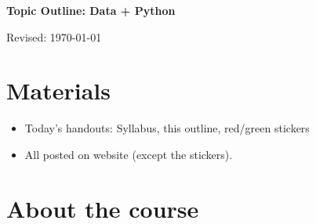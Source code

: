 


\pagestyle{headandfoot}
\runningheadrule
\firstpageheadrule
{}
\runningheader{}{}{}
\runningfooter{}{}{}


\bigskip
\centerline{\Large \bf Topic Outline:  Data + Python}
\medskip
\centerline{Revised: \today}


\section*{Materials}

\begin{itemize}
\item  Today's handouts:  Syllabus, this outline, red/green stickers
\item  All posted on website (except the stickers).
\end{itemize}

\section*{About the course}

